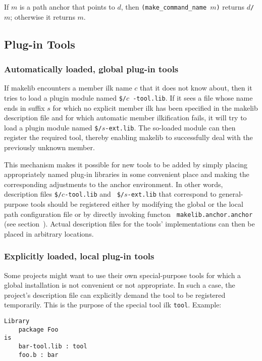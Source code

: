 If $m$ is a path anchor that points to $d$, then {\tt (make_command_name $m$)}
returns $d${\tt /}$m$; otherwise it returns $m$.

\subsection{Plug-in Tools}
\label{sec:plugintools}

\subsubsection{Automatically loaded, global plug-in tools}

If makelib encounters a member ilk name $c$ that it does not know about,
then it tries to load a plugin module named {\tt \$/}$c${\tt
-tool.lib}.  If it sees a file whose name ends in suffix $s$ for which
no explicit member ilk has been specified in the makelib description file
and for which automatic member ilkification fails, it will try to
load a plugin module named {\tt \$/}$s${\tt -ext.lib}.  The so-loaded
module can then register the required tool, thereby enabling makelib to
successfully deal with the previously unknown member.

This mechanism makes it possible for new tools to be added by simply
placing appropriately named plug-in libraries in some convenient place
and making the corresponding adjustments to the anchor environment.
In other words, description files {\tt \$/}$c${\tt -tool.lib} and {\tt
\$/}$s${\tt -ext.lib} that correspond to general-purpose tools should
be registered either by modifying the global or the local path
configuration file or by directly invoking functon {\tt
makelib.anchor.anchor} (see section~).  Actual
description files for the tools' implementations can then be placed in
arbitrary locations.

\subsubsection{Explicitly loaded, local plug-in tools}
\label{sec:localtools}

Some projects might want to use their own special-purpose tools for
which a global installation is not convenient or not appropriate.  In
such a case, the project's description file can explicitly demand the
tool to be registered temporarily.  This is the purpose of the special
tool ilk {\tt tool}.  Example:

\begin{verbatim}
Library
    package Foo
is
    bar-tool.lib : tool
    foo.b : bar
\end{verbatim}

